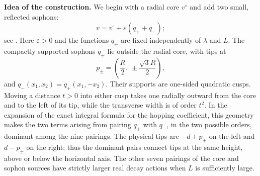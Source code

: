 \documentclass[11pt]{article}
\newcommand{\eps}{\varepsilon}
\begin{document}
\medskip\noindent\textbf{Idea of the construction.}
We begin with a radial core $v^\circ$ and add two small, reflected sophons:
\[
 v=v^\circ+\eps(q_++q_-);
\]
see . Here $\eps>0$ and the functions
$q_\pm$ are fixed independently of $\lambda$ and $L$. The compactly
supported sophons $q_\pm$ lie outside the radial core, with tips at
\begin{equation}\label{eq:cusplocation}
 p_\pm=\left(\frac R2,\,\pm\frac{\sqrt3R}{2}\right),
\end{equation}
and $q_-(x_1,x_2)=q_+(x_1,-x_2)$. Their supports are one-sided quadratic
cusps. Moving a distance $t>0$ into either cusp takes one radially outward
from the core and to the left of its tip, while the transverse width is of
order $t^2$. In the expansion of the exact integral formula for the hopping
coefficient, this geometry makes the two terms arising from pairing $q_+$
with $q_-$, in the two possible orders, dominant among the nine pairings.
The physical tips are $-d+p_\pm$ on the left and $d-p_\pm$ on the right;
thus the dominant pairs connect tips at the same height, above or below
the horizontal axis. The other seven pairings of the core and sophon
sources have strictly larger real decay actions when $L$ is sufficiently
large.
\end{document}
